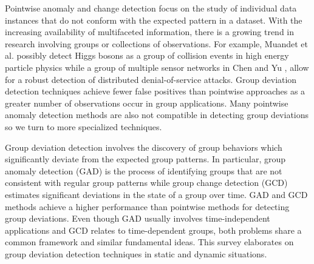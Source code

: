 Pointwise anomaly and change detection focus on the study of individual data instances that do not conform with the expected pattern in a dataset. With the increasing availability of multifaceted information, there is a growing trend in research involving groups or collections of observations. For example,  
 Muandet et al.	\cite{OCSMM} possibly detect Higgs bosons as a group of collision events  in high energy particle physics while a group of multiple sensor networks in Chen and Yu \cite{chen2016collaborative}, allow for a robust  detection of  distributed denial-of-service attacks. Group deviation detection  techniques achieve fewer false positives than pointwise approaches as a greater number of observations occur in group applications. %
  Many pointwise anomaly detection methods are also not compatible  in detecting  group deviations so we turn to more specialized techniques.  
 



 

Group deviation detection involves the discovery of group behaviors which significantly deviate from the expected group patterns.   In particular, group anomaly detection (GAD) is the process of identifying groups that are not consistent with regular group patterns while group change detection (GCD) estimates significant deviations in the state of a group over  time. GAD and GCD methods achieve a higher performance  than pointwise methods for detecting group deviations. Even though GAD usually involves time-independent  applications and GCD relates to time-dependent groups, both problems share a common framework  and similar fundamental ideas.  
This survey  elaborates on group deviation detection techniques in static and dynamic situations. 

 

